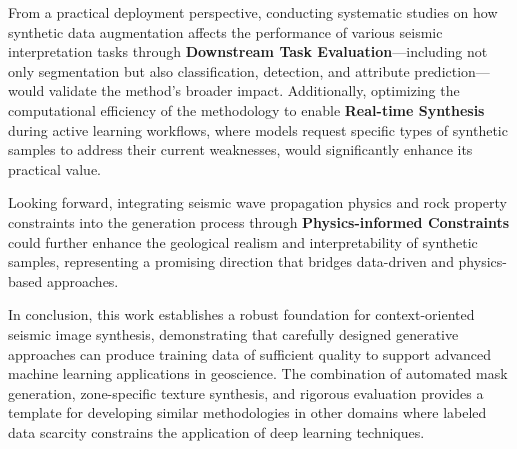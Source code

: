 \documentclass{ieeeaccess}
\begin{document}
From a practical deployment perspective, conducting systematic studies on how synthetic data augmentation affects the performance of various seismic interpretation tasks through \textbf{Downstream Task Evaluation}—including not only segmentation but also classification, detection, and attribute prediction—would validate the method's broader impact. Additionally, optimizing the computational efficiency of the methodology to enable \textbf{Real-time Synthesis} during active learning workflows, where models request specific types of synthetic samples to address their current weaknesses, would significantly enhance its practical value.

Looking forward, integrating seismic wave propagation physics and rock property constraints into the generation process through \textbf{Physics-informed Constraints} could further enhance the geological realism and interpretability of synthetic samples, representing a promising direction that bridges data-driven and physics-based approaches.

In conclusion, this work establishes a robust foundation for context-oriented seismic image synthesis, demonstrating that carefully designed generative approaches can produce training data of sufficient quality to support advanced machine learning applications in geoscience. The combination of automated mask generation, zone-specific texture synthesis, and rigorous evaluation provides a template for developing similar methodologies in other domains where labeled data scarcity constrains the application of deep learning techniques.
\end{document}

